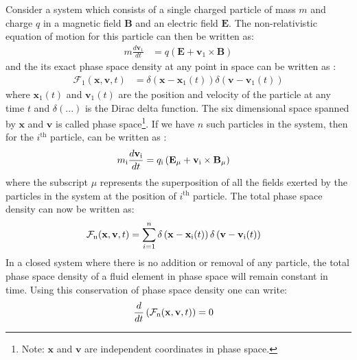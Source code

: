             Consider a system which consists of a single charged particle of mass $m$ and charge $q$
            in a magnetic field $\mathbf{B}$ and an electric field $\mathbf{E}$. The
            non-relativistic equation of motion for this particle can then be written as:
            \begin{align}
                m \frac{d\mathbf{v}_1}{dt} & = q\left(\mathbf{E} + \mathbf{v}_1 \times \mathbf{B}\right) \label{eq:emot1}
            \end{align}
            and the its exact phase space density at any point in space can be written as :
            \begin{align}
                \mathcal{F}_1(\mathbf{x},\mathbf{v},t) & = \delta \left(\mathbf{x}-\mathbf{x}_1(t)\right)\delta \left(\mathbf{v}-\mathbf{v}_1(t)\right) \label{eq:dens1}
            \end{align}
            where $\mathbf{x}_1(t)$ and $\mathbf{v}_1(t)$ are the position and velocity of the
            particle at any time $t$ and $\delta(...)$ is the Dirac delta function. The six
            dimensional space spanned by $\mathbf{x}$ and $\mathbf{v}$ is called phase
            space\footnote{Note: $\mathbf{x}$ and $\mathbf{v}$ are independent coordinates in phase
            space.}. If we have $n$ such particles in the system, then for the $i^\mathrm{th}$
            particle,  can be written as :
            \begin{align}
                m_{\rm i} \frac{d\mathbf{v}_{\rm i}}{dt} & = q_{\rm i}\left(\mathbf{E}_\mu + \mathbf{v}_{\rm i} \times \mathbf{B}_\mu\right) \label{eq:emotn}
            \end{align}
            where the subscript $\mu$ represents the superposition of all the fields exerted by the
            particles in the system at the position of $i^\mathrm{th}$ particle. The total phase
            space density can now be written as:
            \begin{align}
                \mathcal{F}_{\rm n}(\mathbf{x},\mathbf{v},t) & = \sum_{i=1}^{n}\delta \left(\mathbf{x}-\mathbf{x}_{\rm i}(t)\right)\delta \left(\mathbf{v}-\mathbf{v}_{\rm i}(t)\right) \label{eq:densn}
            \end{align}
            In a closed system where there is no addition or removal of any particle, the total
            phase space density of a fluid element in phase space will remain constant in time.
            Using this conservation of phase space density one can write:
            \begin{align}
                \frac{d}{dt}\left(\mathcal{F}_{\rm n}(\mathbf{x},\mathbf{v},t)\right) & = 0 \label{eq:cons}
            \end{align}
